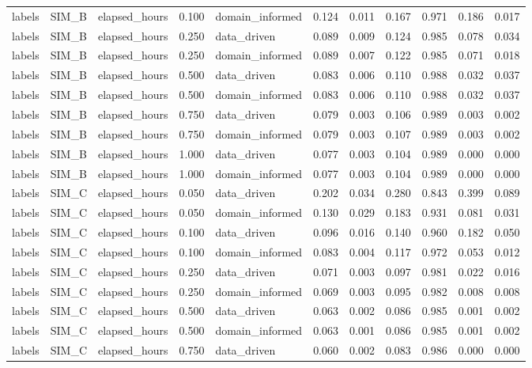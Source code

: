 \begin{table}
\begin{tabular}{lllrlrrrrrr}
labels & SIM\_B & elapsed\_hours & 0.100 & domain\_informed & 0.124 & 0.011 & 0.167 & 0.971 & 0.186 & 0.017 \\
labels & SIM\_B & elapsed\_hours & 0.250 & data\_driven & 0.089 & 0.009 & 0.124 & 0.985 & 0.078 & 0.034 \\
labels & SIM\_B & elapsed\_hours & 0.250 & domain\_informed & 0.089 & 0.007 & 0.122 & 0.985 & 0.071 & 0.018 \\
labels & SIM\_B & elapsed\_hours & 0.500 & data\_driven & 0.083 & 0.006 & 0.110 & 0.988 & 0.032 & 0.037 \\
labels & SIM\_B & elapsed\_hours & 0.500 & domain\_informed & 0.083 & 0.006 & 0.110 & 0.988 & 0.032 & 0.037 \\
labels & SIM\_B & elapsed\_hours & 0.750 & data\_driven & 0.079 & 0.003 & 0.106 & 0.989 & 0.003 & 0.002 \\
labels & SIM\_B & elapsed\_hours & 0.750 & domain\_informed & 0.079 & 0.003 & 0.107 & 0.989 & 0.003 & 0.002 \\
labels & SIM\_B & elapsed\_hours & 1.000 & data\_driven & 0.077 & 0.003 & 0.104 & 0.989 & 0.000 & 0.000 \\
labels & SIM\_B & elapsed\_hours & 1.000 & domain\_informed & 0.077 & 0.003 & 0.104 & 0.989 & 0.000 & 0.000 \\
labels & SIM\_C & elapsed\_hours & 0.050 & data\_driven & 0.202 & 0.034 & 0.280 & 0.843 & 0.399 & 0.089 \\
labels & SIM\_C & elapsed\_hours & 0.050 & domain\_informed & 0.130 & 0.029 & 0.183 & 0.931 & 0.081 & 0.031 \\
labels & SIM\_C & elapsed\_hours & 0.100 & data\_driven & 0.096 & 0.016 & 0.140 & 0.960 & 0.182 & 0.050 \\
labels & SIM\_C & elapsed\_hours & 0.100 & domain\_informed & 0.083 & 0.004 & 0.117 & 0.972 & 0.053 & 0.012 \\
labels & SIM\_C & elapsed\_hours & 0.250 & data\_driven & 0.071 & 0.003 & 0.097 & 0.981 & 0.022 & 0.016 \\
labels & SIM\_C & elapsed\_hours & 0.250 & domain\_informed & 0.069 & 0.003 & 0.095 & 0.982 & 0.008 & 0.008 \\
labels & SIM\_C & elapsed\_hours & 0.500 & data\_driven & 0.063 & 0.002 & 0.086 & 0.985 & 0.001 & 0.002 \\
labels & SIM\_C & elapsed\_hours & 0.500 & domain\_informed & 0.063 & 0.001 & 0.086 & 0.985 & 0.001 & 0.002 \\
labels & SIM\_C & elapsed\_hours & 0.750 & data\_driven & 0.060 & 0.002 & 0.083 & 0.986 & 0.000 & 0.000 \\

\end{tabular}
\end{table}

